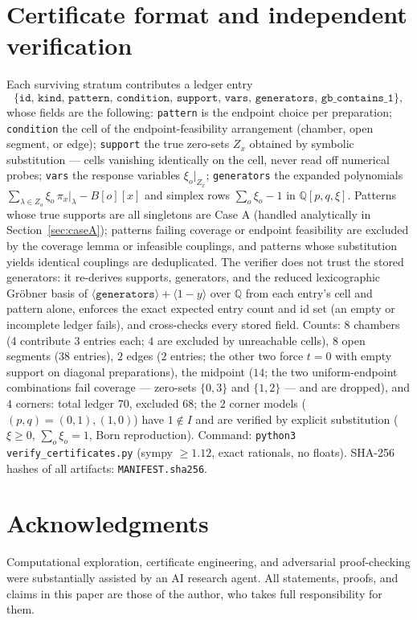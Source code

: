 \documentclass[11pt,a4paper]{article}
\begin{document}
\section{Certificate format and independent verification}
Each surviving stratum contributes a ledger entry
\[ \texttt{\{id, kind, pattern, condition, support, vars, generators, gb\_contains\_1\}}, \]
whose fields are the following:
\texttt{pattern} is the endpoint choice per preparation; \texttt{condition} the cell of the
endpoint-feasibility arrangement (chamber, open segment, or edge); \texttt{support} the true
zero-sets $Z_x$ obtained by symbolic substitution --- cells vanishing identically on the cell,
never read off numerical probes; \texttt{vars} the response variables $\xi_o|_{Z_x}$;
\texttt{generators} the expanded polynomials $\sum_{\lambda\in Z_o}\xi_o\,\pi_x|_\lambda - B[o][x]$
and simplex rows $\sum_o\xi_o-1$ in $\mathbb{Q}[p,q,\xi]$. Patterns whose true supports are all
singletons are Case A (handled analytically in Section~\ref{sec:caseA}); patterns failing coverage
or endpoint feasibility are excluded by the coverage lemma or infeasible couplings, and patterns
whose substitution yields identical couplings are deduplicated.
The verifier does not trust the stored generators: it re-derives supports, generators, and the
reduced lexicographic Gr\"obner basis of $\langle\texttt{generators}\rangle+\langle 1-y\rangle$
over $\mathbb{Q}$ from each entry's cell and pattern alone, enforces the exact expected entry
count and id set (an empty or incomplete ledger fails), and cross-checks every stored field.
Counts: $8$ chambers (4 contribute $3$ entries each; $4$ are excluded by unreachable cells),
$8$ open segments ($38$ entries), $2$ edges ($2$ entries; the other two force $t=0$ with empty
support on diagonal preparations), the midpoint ($14$; the two uniform-endpoint combinations
fail coverage --- zero-sets $\{0,3\}$ and $\{1,2\}$ --- and are dropped), and $4$ corners:
total ledger $70$, excluded $68$; the $2$ corner models ($(p,q)=(0,1),(1,0)$) have $1\notin I$
and are verified by explicit substitution ($\xi\ge0$, $\sum_o\xi_o=1$, Born reproduction).
Command: \texttt{python3 verify\_certificates.py} (sympy $\ge 1.12$, exact rationals, no floats).
SHA-256 hashes of all artifacts: \texttt{MANIFEST.sha256}.

\section*{Acknowledgments}
Computational exploration, certificate engineering, and adversarial proof-checking were
substantially assisted by an AI research agent. All statements, proofs, and claims in this
paper are those of the author, who takes full responsibility for them.
\end{document}
